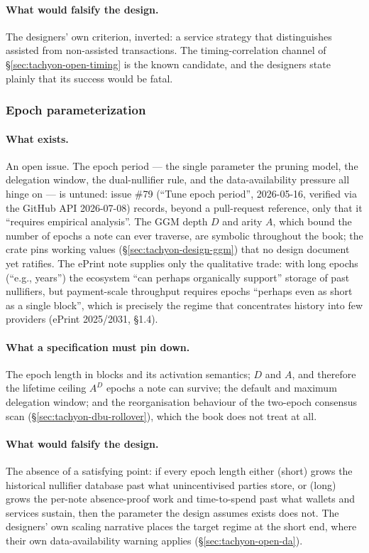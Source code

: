 \documentclass[11pt,a4paper]{article}
\theoremstyle{definition}
\begin{document}
\paragraph{What would falsify the design.} The designers' own criterion,
inverted: a service strategy that distinguishes assisted from non-assisted
transactions. The timing-correlation channel of
\S\ref{sec:tachyon-open-timing} is the known candidate, and the designers
state plainly that its success would be fatal.

\subsubsection{Epoch parameterization}\label{sec:tachyon-dbu-epoch}

\paragraph{What exists.} An open issue. The epoch period --- the single
parameter the pruning model, the delegation window, the dual-nullifier rule,
and the data-availability pressure all hinge on --- is untuned: issue \#79
(``Tune epoch period'', 2026-05-16, verified via the GitHub API 2026-07-08)
records, beyond a pull-request reference, only that it ``requires empirical
analysis''. The GGM depth $D$ and
arity $A$, which bound the number of epochs a note can ever traverse, are
symbolic throughout the book; the crate pins working values
(\S\ref{sec:tachyon-design-ggm}) that no design document yet ratifies. The ePrint note supplies only the
qualitative trade: with long epochs (``e.g., years'') the ecosystem ``can
perhaps organically support'' storage of past nullifiers, but payment-scale
throughput requires epochs ``perhaps even as short as a single block'',
which is precisely the regime that concentrates history into few providers
(ePrint 2025/2031, \S1.4).

\paragraph{What a specification must pin down.} The epoch length in blocks
and its activation semantics; $D$ and $A$, and therefore the lifetime
ceiling $A^D$ epochs a note can survive; the default and maximum delegation
window; and the reorganisation behaviour of the two-epoch consensus scan
(\S\ref{sec:tachyon-dbu-rollover}), which the book does not treat at all.

\paragraph{What would falsify the design.} The absence of a satisfying
point: if every epoch length either (short) grows the historical nullifier
database past what unincentivised parties store, or (long) grows the
per-note absence-proof work and time-to-spend past what wallets and services
sustain, then the parameter the design assumes exists does not. The
designers' own scaling narrative places the target regime at the short end,
where their own data-availability warning applies
(\S\ref{sec:tachyon-open-da}).
\end{document}
